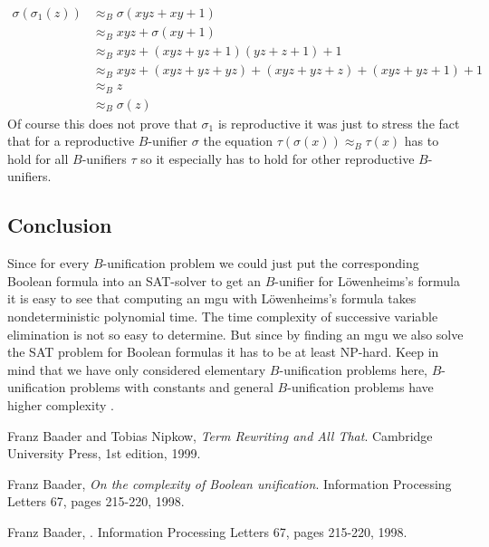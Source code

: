 	\begin{align*}
		\sigma(\sigma_1(z)) & \approx_B\sigma(xyz+xy+1)                        \\
		                    & \approx_Bxyz+\sigma(xy+1)                        \\
		                    & \approx_Bxyz+(xyz+yz+1)(yz+z+1)+1                \\
		                    & \approx_Bxyz+(xyz+yz+yz)+(xyz+yz+z)+(xyz+yz+1)+1 \\
		                    & \approx_Bz                                       \\
		                    & \approx_B\sigma(z)                               
	\end{align*}
	Of course this does not prove that $\sigma_1$ is reproductive it was just to stress the fact that for a reproductive $B$-unifier $\sigma$ the equation $\tau(\sigma(x))\approx_B\tau(x)$ has to hold for all $B$-unifiers $\tau$ so it especially has to hold for other reproductive $B$-unifiers.
	\subsection{Conclusion}
	Since for every $B$-unification problem we could just put the corresponding Boolean formula into an SAT-solver to get an $B$-unifier for Löwenheims's formula it is easy to see that computing an mgu with Löwenheims's formula takes nondeterministic polynomial time. The time complexity of successive variable elimination is not so easy to determine. But since by finding an mgu we also solve the SAT problem for Boolean formulas it has to be at least NP-hard. Keep in mind that we have only considered elementary $B$-unification problems here, $B$-unification problems with constants and general $B$-unification problems have higher complexity \cite{cmplxBU}.
	\begin{thebibliography}{9}
				
		Franz Baader and Tobias Nipkow,
		\emph{Term Rewriting and All That}.
		Cambridge University Press,
		1st edition,
		1999.
				
		Franz Baader,
		\emph{On the complexity of Boolean unification}.
		Information Processing Letters 67,
		pages 215-220,
		1998.
		
		Franz Baader,
		\emph{}.
		Information Processing Letters 67,
		pages 215-220,
		1998.
				
	\end{thebibliography}